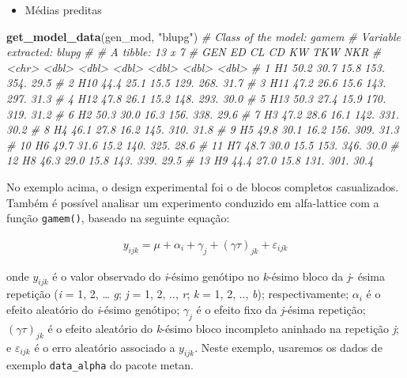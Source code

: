 \documentclass[
]{book}
\newenvironment{Shaded}{\begin{snugshade}}{\end{snugshade}}
\newcommand{\CommentTok}[1]{\textcolor[rgb]{0.56,0.35,0.01}{\textit{#1}}}
\newcommand{\KeywordTok}[1]{\textcolor[rgb]{0.13,0.29,0.53}{\textbf{#1}}}
\newcommand{\NormalTok}[1]{#1}
\newcommand{\StringTok}[1]{\textcolor[rgb]{0.31,0.60,0.02}{#1}}
\providecommand{\tightlist}{%
  \setlength{\itemsep}{0pt}\setlength{\parskip}{0pt}}
\numberwithin{equation}{section}
\begin{document}
\begin{itemize}
\tightlist
\item
  Médias preditas
\end{itemize}

\begin{Shaded}
\begin{Highlighting}[]
\KeywordTok{get\_model\_data}\NormalTok{(gen\_mod, }\StringTok{"blupg"}\NormalTok{)}
\CommentTok{\# Class of the model: gamem}
\CommentTok{\# Variable extracted: blupg}
\CommentTok{\# \# A tibble: 13 x 7}
\CommentTok{\#    GEN      ED    CL    CD    KW   TKW   NKR}
\CommentTok{\#    \textless{}chr\textgreater{} \textless{}dbl\textgreater{} \textless{}dbl\textgreater{} \textless{}dbl\textgreater{} \textless{}dbl\textgreater{} \textless{}dbl\textgreater{} \textless{}dbl\textgreater{}}
\CommentTok{\#  1 H1     50.2  30.7  15.8  153.  354.  29.5}
\CommentTok{\#  2 H10    44.4  25.1  15.5  129.  268.  31.7}
\CommentTok{\#  3 H11    47.2  26.6  15.6  143.  297.  31.3}
\CommentTok{\#  4 H12    47.8  26.1  15.2  148.  293.  30.0}
\CommentTok{\#  5 H13    50.3  27.4  15.9  170.  319.  31.2}
\CommentTok{\#  6 H2     50.3  30.0  16.3  156.  338.  29.6}
\CommentTok{\#  7 H3     47.2  28.6  16.1  142.  331.  30.2}
\CommentTok{\#  8 H4     46.1  27.8  16.2  145.  310.  31.8}
\CommentTok{\#  9 H5     49.8  30.1  16.2  156.  309.  31.3}
\CommentTok{\# 10 H6     49.7  31.6  15.2  140.  325.  28.6}
\CommentTok{\# 11 H7     48.7  30.0  15.5  153.  346.  30.0}
\CommentTok{\# 12 H8     46.3  29.0  15.8  143.  339.  29.5}
\CommentTok{\# 13 H9     44.4  27.0  15.8  131.  301.  30.4}
\end{Highlighting}
\end{Shaded}

No exemplo acima, o design experimental foi o de blocos completos casualizados. Também é possível analisar um experimento conduzido em alfa-lattice com a função \texttt{gamem()}, baseado na seguinte equação:

\begin{gather}
y_{ijk}= \mu  + \alpha_i + \gamma_j + (\gamma \tau)_{jk} + \varepsilon_{ijk}
\end{gather}

onde \(y_ {ijk}\) é o valor observado do \emph{i}-ésimo genótipo no \emph{k}-ésimo bloco da \emph{j}- ésima repetição (\emph{i} = 1, 2, \ldots{} \emph{g}; \emph{j} = 1, 2, .., \emph{r}; \emph{k} = 1, 2, .., \emph{b}); respectivamente; \(\alpha_i\) é o efeito aleatório do \emph{i}-ésimo genótipo; \(\gamma_j\) é o efeito fixo da \emph{j}-ésima repetição; \((\gamma \tau)_{jk}\) é o efeito aleatório do \emph{k}-ésimo bloco incompleto aninhado na repetição \emph{j}; e \(\varepsilon_{ijk}\) é o erro aleatório associado a \(y_{ijk}\). Neste exemplo, usaremos os dados de exemplo \texttt{data\_alpha} do pacote metan.
\end{document}
